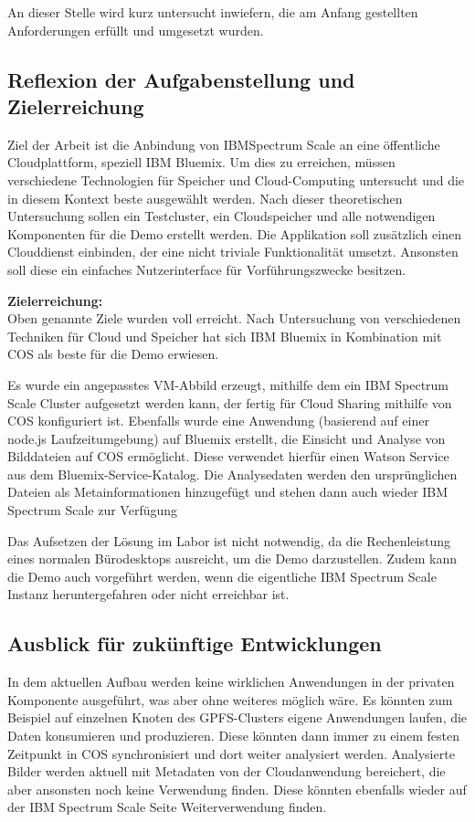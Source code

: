An dieser Stelle wird kurz untersucht inwiefern, die am Anfang gestellten Anforderungen erfüllt und umgesetzt wurden.

\subsection{Reflexion der Aufgabenstellung und Zielerreichung}

Ziel der Arbeit ist die Anbindung von IBMSpectrum Scale an eine öffentliche Cloudplattform, speziell IBM Bluemix. Um dies zu erreichen, müssen verschiedene Technologien für Speicher und Cloud-Computing untersucht und die in diesem Kontext beste ausgewählt werden. Nach dieser theoretischen Untersuchung sollen ein Testcluster, ein Cloudspeicher und alle notwendigen Komponenten für die Demo erstellt werden.
Die Applikation soll zusätzlich einen Clouddienst einbinden, der eine nicht triviale Funktionalität umsetzt. Ansonsten soll diese ein einfaches Nutzerinterface für Vorführungszwecke besitzen.

\textbf{Zielerreichung:}\\
Oben genannte Ziele wurden voll erreicht. Nach Untersuchung von verschiedenen Techniken für Cloud und Speicher hat sich IBM Bluemix in Kombination mit \ac{COS} als beste für die Demo erwiesen. 

Es wurde ein angepasstes VM-Abbild erzeugt, mithilfe dem ein IBM Spectrum Scale Cluster aufgesetzt werden kann, der fertig für Cloud Sharing mithilfe von \acl{COS} konfiguriert ist. Ebenfalls wurde eine Anwendung (basierend auf einer node.js Laufzeitumgebung) auf Bluemix erstellt, die Einsicht und Analyse von Bilddateien auf \ac{COS} ermöglicht. Diese verwendet hierfür einen Watson Service aus dem Bluemix-Service-Katalog. Die Analysedaten werden den ursprünglichen Dateien als Metainformationen hinzugefügt und stehen dann auch wieder IBM Spectrum Scale zur Verfügung 

Das Aufsetzen der Lösung im Labor ist nicht notwendig, da die Rechenleistung eines normalen Bürodesktops ausreicht, um die Demo darzustellen. Zudem kann die Demo auch vorgeführt werden, wenn die eigentliche IBM Spectrum Scale Instanz heruntergefahren oder nicht erreichbar ist.

\subsection{Ausblick für zukünftige Entwicklungen}
In dem aktuellen Aufbau werden keine wirklichen Anwendungen in der privaten Komponente ausgeführt, was aber ohne weiteres möglich wäre. Es könnten zum Beispiel auf einzelnen Knoten des GPFS-Clusters eigene Anwendungen laufen, die Daten konsumieren und produzieren. Diese könnten dann immer zu einem festen Zeitpunkt in \ac{COS} synchronisiert und dort weiter analysiert werden.
Analysierte Bilder werden aktuell mit Metadaten von der Cloudanwendung bereichert, die aber ansonsten noch keine Verwendung finden. Diese könnten ebenfalls wieder auf der IBM Spectrum Scale Seite Weiterverwendung finden. 

